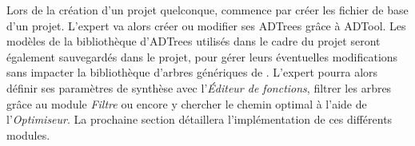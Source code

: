 Lors de la création d'un projet quelconque, \glasir{} commence par créer les fichier de base d'un projet. L'expert va alors créer ou modifier ses ADTrees grâce à ADTool. Les modèles de la bibliothèque d'ADTrees utilisés dans le cadre du projet seront également sauvegardés dans le projet, pour gérer leurs éventuelles modifications sans impacter la bibliothèque d'arbres génériques de \glasir{}. L'expert pourra alors définir ses paramètres de synthèse avec l’\emph{Éditeur de fonctions}, filtrer les arbres grâce au module \emph{Filtre} ou encore y chercher le chemin optimal à l'aide de l'\emph{Optimiseur}. La prochaine section détaillera l'implémentation de ces différents modules. 